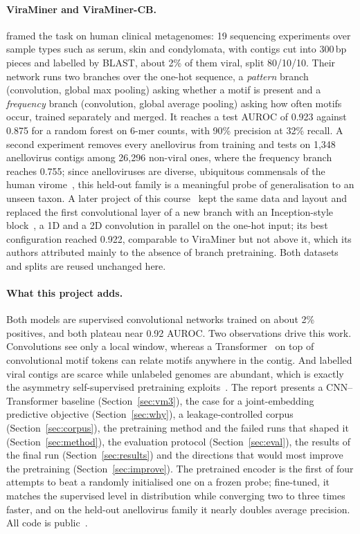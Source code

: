 \documentclass[10pt,twocolumn,a4paper]{article}
\begin{document}
\paragraph{ViraMiner and ViraMiner-CB.}
\citet{tampuu2019viraminer} framed the task on human clinical metagenomes: 19
sequencing experiments over sample types such as serum, skin and condylomata,
with contigs cut into 300\,bp pieces and labelled by BLAST, about 2\% of them
viral, split 80/10/10. Their network runs two branches over the one-hot
sequence, a \emph{pattern} branch (convolution, global max pooling) asking
whether a motif is present and a \emph{frequency} branch (convolution, global
average pooling) asking how often motifs occur, trained separately and merged.
It reaches a test AUROC of 0.923 against 0.875 for a random forest on 6-mer
counts, with 90\% precision at 32\% recall. A second experiment removes every
anellovirus from training and tests on 1{,}348 anellovirus contigs among
26{,}296 non-viral ones, where the frequency branch reaches 0.755; since
anelloviruses are diverse, ubiquitous commensals of the human
virome~\cite{kaczorowska2020anello}, this held-out family is a meaningful probe
of generalisation to an unseen taxon. A later project of this
course~\cite{pivotto2024viraminercb} kept the same data and layout and replaced
the first convolutional layer of a new branch with an Inception-style
block~\cite{szegedy2015inception}, a 1D and a 2D convolution in parallel on the
one-hot input; its best configuration reached 0.922, comparable to ViraMiner but
not above it, which its authors attributed mainly to the absence of branch
pretraining. Both datasets and splits are reused unchanged here.

\paragraph{What this project adds.}
Both models are supervised convolutional networks trained on about 2\%
positives, and both plateau near 0.92 AUROC. Two observations drive this work.
Convolutions see only a local window, whereas a
Transformer~\cite{vaswani2017attention} on top of convolutional motif tokens can
relate motifs anywhere in the contig. And labelled viral contigs are scarce
while unlabeled genomes are abundant, which is exactly the asymmetry
self-supervised pretraining
exploits~\cite{ji2021dnabert,zhou2024dnabert2,dallatorre2025nt,nguyen2023hyenadna}.
The report presents a CNN--Transformer baseline (Section~\ref{sec:vm3}), the
case for a joint-embedding predictive objective (Section~\ref{sec:why}), a
leakage-controlled corpus (Section~\ref{sec:corpus}), the pretraining method and
the failed runs that shaped it (Section~\ref{sec:method}), the evaluation
protocol (Section~\ref{sec:eval}), the results of the final run
(Section~\ref{sec:results}) and the directions that would most improve the
pretraining (Section~\ref{sec:improve}). The pretrained encoder is the first of four
attempts to beat a randomly initialised one on a frozen probe; fine-tuned, it
matches the supervised level in distribution while converging two to three times faster,
and on the held-out anellovirus family it nearly doubles average precision. All code is
public~\cite{grigolin2026viraminer3,grigolin2026corpus,grigolin2026viraljepa}.
\end{document}
